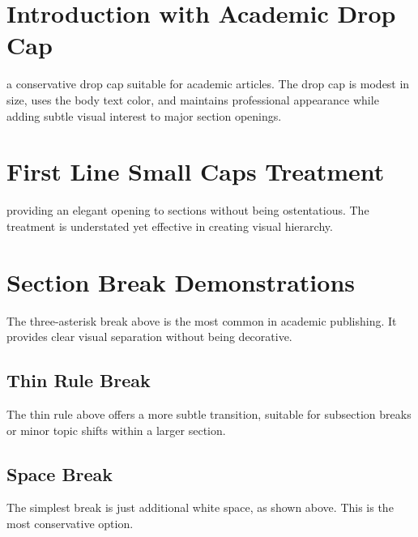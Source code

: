 \documentclass[11pt]{article}
\begin{document}
\section{Introduction with Academic Drop Cap}

 a conservative drop cap suitable for academic articles. The drop cap is modest in size, uses the body text color, and maintains professional appearance while adding subtle visual interest to major section openings.

\lipsum[1]

\section{First Line Small Caps Treatment}

 providing an elegant opening to sections without being ostentatious. The treatment is understated yet effective in creating visual hierarchy.

\lipsum[2]

\sectionsep

\section{Section Break Demonstrations}

The three-asterisk break above is the most common in academic publishing. It provides clear visual separation without being decorative.

\lipsum[3]

\thinrulebreak

\subsection{Thin Rule Break}

The thin rule above offers a more subtle transition, suitable for subsection breaks or minor topic shifts within a larger section.

\lipsum[4]

\spacebreak

\subsection{Space Break}

The simplest break is just additional white space, as shown above. This is the most conservative option.
\end{document}
